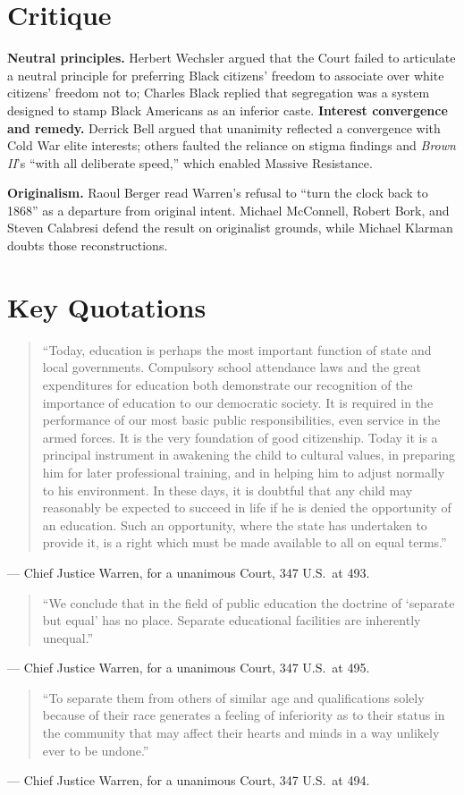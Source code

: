 \documentclass[12pt]{article}
\begin{document}
\section{Critique}

\textbf{Neutral principles.} Herbert Wechsler argued that the Court failed to articulate a neutral principle for preferring Black citizens' freedom to associate over white citizens' freedom not to; Charles Black replied that segregation was a system designed to stamp Black Americans as an inferior caste. \textbf{Interest convergence and remedy.} Derrick Bell argued that unanimity reflected a convergence with Cold War elite interests; others faulted the reliance on stigma findings and \textit{Brown II}'s ``with all deliberate speed,'' which enabled Massive Resistance.

\textbf{Originalism.} Raoul Berger read Warren's refusal to ``turn the clock back to 1868'' as a departure from original intent. Michael McConnell, Robert Bork, and Steven Calabresi defend the result on originalist grounds, while Michael Klarman doubts those reconstructions.

\section{Key Quotations}

\begin{quote}
``Today, education is perhaps the most important function of state and local governments. Compulsory school attendance laws and the great expenditures for education both demonstrate our recognition of the importance of education to our democratic society. It is required in the performance of our most basic public responsibilities, even service in the armed forces. It is the very foundation of good citizenship. Today it is a principal instrument in awakening the child to cultural values, in preparing him for later professional training, and in helping him to adjust normally to his environment. In these days, it is doubtful that any child may reasonably be expected to succeed in life if he is denied the opportunity of an education. Such an opportunity, where the state has undertaken to provide it, is a right which must be made available to all on equal terms.''
\end{quote}
\noindent --- Chief Justice Warren, for a unanimous Court, 347 U.S.\ at 493.

\begin{quote}
``We conclude that in the field of public education the doctrine of `separate but equal' has no place. Separate educational facilities are inherently unequal.''
\end{quote}
\noindent --- Chief Justice Warren, for a unanimous Court, 347 U.S.\ at 495.

\begin{quote}
``To separate them from others of similar age and qualifications solely because of their race generates a feeling of inferiority as to their status in the community that may affect their hearts and minds in a way unlikely ever to be undone.''
\end{quote}
\noindent --- Chief Justice Warren, for a unanimous Court, 347 U.S.\ at 494.
\end{document}
